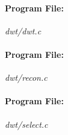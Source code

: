 \documentclass[a4paper,11pt]{article}
\begin{document}
\paragraph{Program File:} \textit{dwt/dwt.c}
\vspace{5pt}
{\scriptsize
\begin{lgrind}

\end{lgrind}
}

\paragraph{Program File:} \textit{dwt/recon.c}
\vspace{5pt}
{\scriptsize
\begin{lgrind}

\end{lgrind}
}

\paragraph{Program File:} \textit{dwt/select.c}
\vspace{5pt}
{\scriptsize
\begin{lgrind}

\end{lgrind}
}

\clearpage



\end{document}
